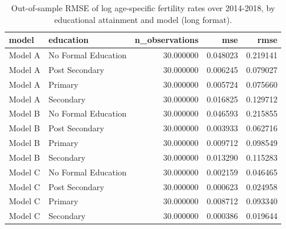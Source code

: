 \begin{table}[ht]
\centering
\begin{tabular}{llrrr}
\hline
model & education & n_observations & mse & rmse \\
\hline
Model A & No Formal Education & 30.000000 & 0.048023 & 0.219141 \\
Model A & Post Secondary & 30.000000 & 0.006245 & 0.079027 \\
Model A & Primary & 30.000000 & 0.005724 & 0.075660 \\
Model A & Secondary & 30.000000 & 0.016825 & 0.129712 \\
Model B & No Formal Education & 30.000000 & 0.046593 & 0.215855 \\
Model B & Post Secondary & 30.000000 & 0.003933 & 0.062716 \\
Model B & Primary & 30.000000 & 0.009712 & 0.098549 \\
Model B & Secondary & 30.000000 & 0.013290 & 0.115283 \\
Model C & No Formal Education & 30.000000 & 0.002159 & 0.046465 \\
Model C & Post Secondary & 30.000000 & 0.000623 & 0.024958 \\
Model C & Primary & 30.000000 & 0.008712 & 0.093340 \\
Model C & Secondary & 30.000000 & 0.000386 & 0.019644 \\
\hline
\end{tabular}
\caption{Out-of-sample RMSE of log age-specific fertility rates over 2014-2018, by educational attainment and model (long format).}
\label{tab:revised_table_e5_long}
\end{table}
